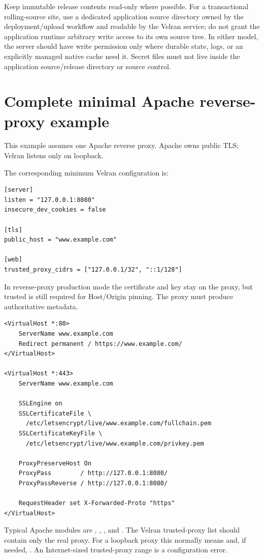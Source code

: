 Keep immutable release contents read-only where possible. For a transactional rolling-source site, use a dedicated application source directory owned by the deployment/upload workflow and readable by the Velran service; do not grant the application runtime arbitrary write access to its own source tree. In either model, the server should have write permission only where durable state, logs, or an explicitly managed native cache need it. Secret files must not live inside the application source/release directory or source control.

\section{Complete minimal Apache reverse-proxy example}

This example assumes one Apache reverse proxy. Apache owns public TLS; Velran listens only on loopback.

The corresponding minimum Velran configuration is:

\begin{lstlisting}
[server]
listen = "127.0.0.1:8080"
insecure_dev_cookies = false

[tls]
public_host = "www.example.com"

[web]
trusted_proxy_cidrs = ["127.0.0.1/32", "::1/128"]
\end{lstlisting}

In reverse-proxy production mode the certificate and key stay on the proxy, but trusted  is still required for Host/Origin pinning. The proxy must produce authoritative  metadata.

\begin{lstlisting}
<VirtualHost *:80>
    ServerName www.example.com
    Redirect permanent / https://www.example.com/
</VirtualHost>

<VirtualHost *:443>
    ServerName www.example.com

    SSLEngine on
    SSLCertificateFile \
      /etc/letsencrypt/live/www.example.com/fullchain.pem
    SSLCertificateKeyFile \
      /etc/letsencrypt/live/www.example.com/privkey.pem

    ProxyPreserveHost On
    ProxyPass        / http://127.0.0.1:8080/
    ProxyPassReverse / http://127.0.0.1:8080/

    RequestHeader set X-Forwarded-Proto "https"
</VirtualHost>
\end{lstlisting}

Typical Apache modules are , , , and . The Velran trusted-proxy list should contain only the real proxy. For a loopback proxy this normally means  and, if needed, . An Internet-sized trusted-proxy range is a configuration error.

